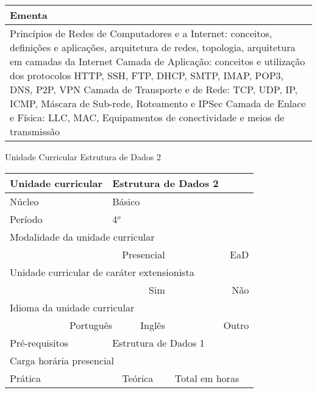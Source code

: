 \begin{quadro}[ht!]
\begin{tabular}{|p{3cm} p{2cm} p{3cm} p{2cm} p{3cm} p{2cm}|}
\multicolumn{6}{|p{15cm}|}{\cellcolor{blue1} Ementa} \\\hline
\hline\multicolumn{6}{|p{15cm}|}{\scriptsize Princípios de Redes de Computadores e a Internet: conceitos, definições e aplicações, arquitetura de redes, topologia, arquitetura em camadas da Internet Camada de Aplicação: conceitos e utilização dos protocolos HTTP, SSH, FTP, DHCP, SMTP, IMAP, POP3, DNS, P2P, VPN Camada de Transporte e de Rede: TCP, UDP, IP, ICMP, Máscara de Sub-rede, Roteamento e IPSec Camada de Enlace e Física: LLC, MAC, Equipamentos de conectividade e meios de transmissão}\\\hline
\hline
	\end{tabular}
\end{quadro}
\begin{quadro}[ht!]
  \centering\scriptsize
\caption{Unidade Curricular Estrutura de Dados 2}
\label{ unit_17 }
\begin{tabular}{|p{3cm} p{2cm} p{3cm} p{2cm} p{3cm} p{2cm}|}\hline
\multicolumn{1}{|p{3cm}|}{\cellcolor{blue1} Unidade curricular} & \multicolumn{5}{p{9cm}|}{ Estrutura de Dados 2 }\\\hline
\multicolumn{1}{|p{3cm}|}{\cellcolor{blue1} Núcleo} & \multicolumn{5}{p{11.5cm}|}{ Básico }\\\hline
\multicolumn{1}{|p{3cm}|}{\cellcolor{blue1} Período} & \multicolumn{5}{p{9cm}|}{ 4$^o$ }\\\hline
\multicolumn{6}{|p{15cm}|}{\cellcolor{blue1} Modalidade da unidade curricular} \\\hline
\multicolumn{2}{|r}{		} &  \multicolumn{2}{r}{Presencial \XBox } & \multicolumn{2}{r|}{EaD \Square	} \\\hline
\multicolumn{6}{|p{15cm}|}{\cellcolor{blue1} Unidade curricular de caráter extensionista} \\\hline
\multicolumn{4}{|r}{			Sim \Square	} & \multicolumn{2}{r|}{	Não \XBox	}\\\hline
\multicolumn{6}{|p{15cm}|}{\cellcolor{blue1} Idioma da unidade curricular} \\ \hline
\multicolumn{2}{|r}{	Português \XBox	} &  \multicolumn{2}{r}{	Inglês \Square	} & \multicolumn{2}{r|}{	Outro \Square	} \\ \hline
\multicolumn{1}{|p{3cm}|}{\cellcolor{blue1} Pré-requisitos} & \multicolumn{5}{p{9cm}|}{ Estrutura de Dados 1 }\\ \hline
\multicolumn{6}{|p{15cm}|}{\cellcolor{blue1} Carga horária presencial} \\ \hline
\multicolumn{1}{|p{3cm}|}{\raggedleft Prática} & \multicolumn{1}{p{1cm}|}{\centering	30	} &  \multicolumn{1}{p{3cm}|}{\raggedleft Teórica}  & \multicolumn{1}{p{1cm}|}{\centering 	30 } & \multicolumn{1}{p{3cm}|}{\raggedleft Total em horas} & \multicolumn{1}{p{1cm}|}{\raggedleft	60	} \\ \hline

\end{tabular}
\end{quadro}
